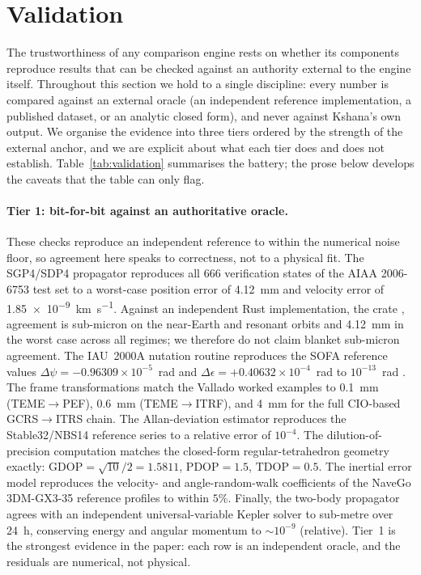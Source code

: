 \section{Validation}\label{sec:validation}

The trustworthiness of any comparison engine rests on whether its components
reproduce results that can be checked against an authority external to the
engine itself. Throughout this section we hold to a single discipline: every
number is compared against an external oracle (an independent reference
implementation, a published dataset, or an analytic closed form), and never
against Kshana's own output. We organise the evidence into three tiers ordered
by the strength of the external anchor, and we are explicit about what each tier
does and does not establish. Table~\ref{tab:validation} summarises the battery;
the prose below develops the caveats that the table can only flag.

\paragraph{Tier 1: bit-for-bit against an authoritative oracle.}
These checks reproduce an independent reference to within the numerical noise
floor, so agreement here speaks to correctness, not to a physical fit. The SGP4/SDP4 propagator reproduces all 666 verification states of
the AIAA 2006-6753 test set \citep{vallado2006} to a worst-case position error
of \SI{4.12}{\milli\metre} and velocity error of
\SI{1.85e-9}{\kilo\metre\per\second}. Against an independent Rust
implementation, the  crate \citep{sgp4crate}, agreement is sub-micron
on the near-Earth and resonant orbits and \SI{4.12}{\milli\metre} in the
worst case across all regimes; we therefore do not claim blanket sub-micron
agreement. The IAU~2000A nutation routine  reproduces the SOFA
reference values $\Delta\psi = -0.96309\times10^{-5}$~rad and
$\Delta\epsilon = +0.40632\times10^{-4}$~rad to $10^{-13}$~rad
\citep{iausofa}. The frame transformations match the Vallado worked examples
\citep{vallado2006,iausofa} to \SI{0.1}{\milli\metre} (TEME$\rightarrow$PEF),
\SI{0.6}{\milli\metre} (TEME$\rightarrow$ITRF), and \SI{4}{\milli\metre} for the
full CIO-based GCRS$\rightarrow$ITRS chain. The Allan-deviation estimator
reproduces the Stable32/NBS14 reference series \citep{stable32,riley2008nist} to
a relative error of $10^{-4}$. The dilution-of-precision computation matches the
closed-form regular-tetrahedron geometry \citep{misra2010,kaplan2017} exactly:
$\mathrm{GDOP}=\sqrt{10}/2=1.5811$, $\mathrm{PDOP}=1.5$, $\mathrm{TDOP}=0.5$.
The inertial error model reproduces the velocity- and angle-random-walk
coefficients of the NaveGo 3DM-GX3-35 reference profiles
\citep{gonzalez2017navego} to within $5\%$. Finally, the two-body propagator
agrees with an independent universal-variable Kepler solver to sub-metre over
\SI{24}{\hour}, conserving energy and angular momentum to $\sim10^{-9}$
(relative). Tier~1 is the strongest evidence in the paper: each row is an
independent oracle, and the residuals are numerical, not physical.


